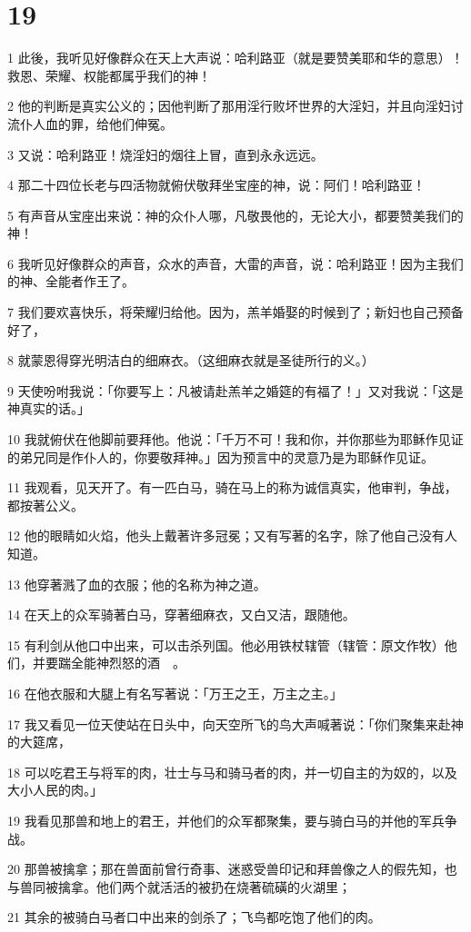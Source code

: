 \chapter{19}

\par 1 此後，我听见好像群众在天上大声说：哈利路亚（就是要赞美耶和华的意思）！救恩、荣耀、权能都属乎我们的神！
\par 2 他的判断是真实公义的；因他判断了那用淫行败坏世界的大淫妇，并且向淫妇讨流仆人血的罪，给他们伸冤。
\par 3 又说：哈利路亚！烧淫妇的烟往上冒，直到永永远远。
\par 4 那二十四位长老与四活物就俯伏敬拜坐宝座的神，说：阿们！哈利路亚！
\par 5 有声音从宝座出来说：神的众仆人哪，凡敬畏他的，无论大小，都要赞美我们的神！
\par 6 我听见好像群众的声音，众水的声音，大雷的声音，说：哈利路亚！因为主我们的神、全能者作王了。
\par 7 我们要欢喜快乐，将荣耀归给他。因为，羔羊婚娶的时候到了；新妇也自己预备好了，
\par 8 就蒙恩得穿光明洁白的细麻衣。（这细麻衣就是圣徒所行的义。）
\par 9 天使吩咐我说：「你要写上：凡被请赴羔羊之婚筵的有福了！」又对我说：「这是神真实的话。」
\par 10 我就俯伏在他脚前要拜他。他说：「千万不可！我和你，并你那些为耶稣作见证的弟兄同是作仆人的，你要敬拜神。」因为预言中的灵意乃是为耶稣作见证。
\par 11 我观看，见天开了。有一匹白马，骑在马上的称为诚信真实，他审判，争战，都按著公义。
\par 12 他的眼睛如火焰，他头上戴著许多冠冕；又有写著的名字，除了他自己没有人知道。
\par 13 他穿著溅了血的衣服；他的名称为神之道。
\par 14 在天上的众军骑著白马，穿著细麻衣，又白又洁，跟随他。
\par 15 有利剑从他口中出来，可以击杀列国。他必用铁杖辖管（辖管：原文作牧）他们，并要踹全能神烈怒的酒　。
\par 16 在他衣服和大腿上有名写著说：「万王之王，万主之主。」
\par 17 我又看见一位天使站在日头中，向天空所飞的鸟大声喊著说：「你们聚集来赴神的大筵席，
\par 18 可以吃君王与将军的肉，壮士与马和骑马者的肉，并一切自主的为奴的，以及大小人民的肉。」
\par 19 我看见那兽和地上的君王，并他们的众军都聚集，要与骑白马的并他的军兵争战。
\par 20 那兽被擒拿；那在兽面前曾行奇事、迷惑受兽印记和拜兽像之人的假先知，也与兽同被擒拿。他们两个就活活的被扔在烧著硫磺的火湖里；
\par 21 其余的被骑白马者口中出来的剑杀了；飞鸟都吃饱了他们的肉。

